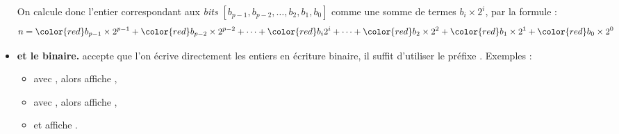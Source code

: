 \documentclass[11pt,class=report,crop=false]{standalone}
\begin{document}
\begin{cours}[Binaire]
\begin{itemize}
On calcule donc l'entier correspondant aux \emph{bits} $[b_{p-1},b_{p-2}, \ldots,b_2,b_1,b_0]$ comme une somme de termes $b_i \times 2^i$, par la formule :
$$n = {\color{red}b_{p-1}} \times 2^{p-1} + {\color{red}b_{p-2}} \times 2^{p-2} + \cdots + {\color{red}b_i} 2^i +  \cdots + {\color{red}b_2} \times 2^2 + {\color{red}b_1} \times 2^1 + {\color{red}b_0} \times 2^0$$
  
    \item \textbf{\Python{} et le binaire.} \Python{} accepte que l'on écrive directement les entiers en écriture binaire, il suffit d'utiliser le préfixe \og{}\fg{}.
    Exemples :
    \begin{itemize}
      \item avec , alors  affiche ,
      \item avec , alors  affiche ,
      \item et  affiche .
    \end{itemize} 
 \end{itemize}     

\end{cours}


\end{document}
